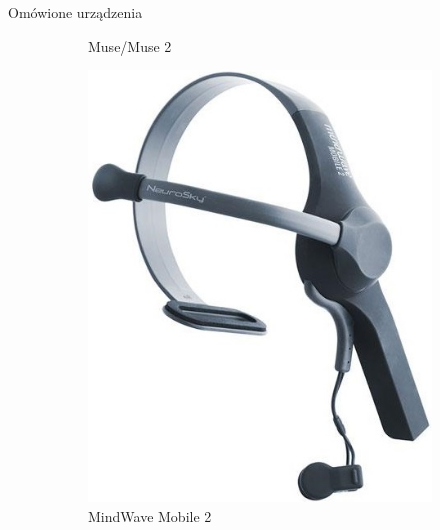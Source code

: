 \documentclass[10pt,aspectratio=169]{beamer}
\begin{document}
\begin{frame}{Omówione urządzenia}
\begin{figure}[htb]
\begin{subfigure}{0.2\linewidth}
    \caption{Muse/Muse 2}
    \end{subfigure}
    \par\bigskip
    \begin{subfigure}{0.2\linewidth}
    \includegraphics[width=\linewidth,keepaspectratio]{obrazy/mindwave}
    \caption{MindWave Mobile 2}
    \end{subfigure}\hspace*{\fill}
    \begin{subfigure}{0.2\linewidth}

\end{subfigure}
\end{figure}
\end{frame}
\end{document}
